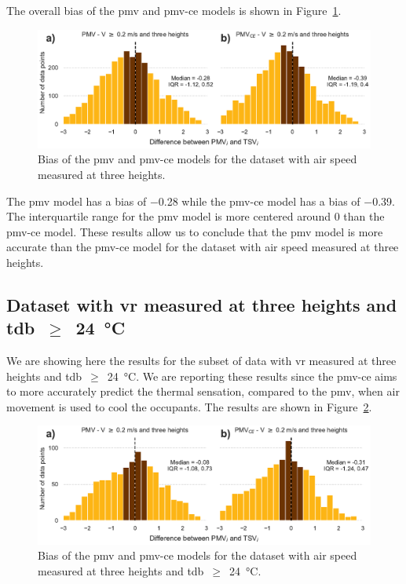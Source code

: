 The overall bias of the \ac{pmv} and \ac{pmv-ce} models is shown in Figure~\ref{fig:hist_discrepancies_three_heights}.
\begin{figure}[htb!]
    \centering
    \includegraphics[width=\textwidth]{figures/hist_discrepancies_three_heights}
    \caption{Bias of the \ac{pmv} and \ac{pmv-ce} models for the dataset with air speed measured at three heights.}
    \label{fig:hist_discrepancies_three_heights}
\end{figure}
The \ac{pmv} model has a bias of \num{-.28} while the \ac{pmv-ce} model has a bias of \num{-.39}.
The interquartile range for the \ac{pmv} model is more centered around \num{0} than the \ac{pmv-ce} model.
These results allow us to conclude that the \ac{pmv} model is more accurate than the \ac{pmv-ce} model for the dataset with air speed measured at three heights.

\subsection{Dataset with \ac{vr} measured at three heights and \ac{tdb}~$\geq$~\qty{24}{\celsius}}\label{subsec:dataset-with-v-measured-at-three-heights-and-tdb-geq-24-celsius}
We are showing here the results for the subset of data with \ac{vr} measured at three heights and \ac{tdb}~$\geq$~\qty{24}{\celsius}.
We are reporting these results since the \ac{pmv-ce} aims to more accurately predict the thermal sensation, compared to the \ac{pmv}, when air movement is used to cool the occupants.
The results are shown in Figure~\ref{fig:hist_discrepancies_three_heights_limit_t}.
\begin{figure}[htb!]
    \centering
    \includegraphics[width=\textwidth]{figures/hist_discrepancies_three_heights_limit_t}
    \caption{Bias of the \ac{pmv} and \ac{pmv-ce} models for the dataset with air speed measured at three heights and \ac{tdb}~$\geq$~\qty{24}{\celsius}.}
    \label{fig:hist_discrepancies_three_heights_limit_t}
\end{figure}

